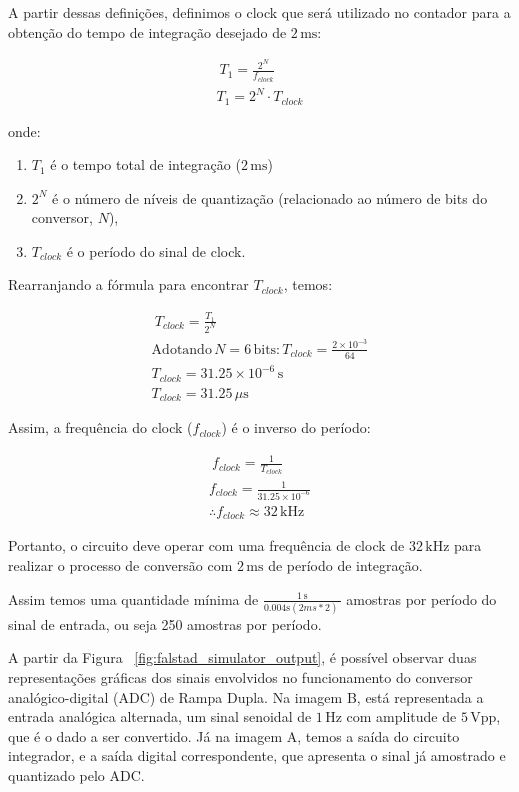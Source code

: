A partir dessas definições, definimos o clock que será utilizado no contador para a obtenção do tempo de integração desejado de $2\, \text{ms}$:

\begin{align} \
    T_{1} = \frac{2^N}{f_{clock}} \\
    T_{1} = 2^N \cdot T_{clock}
\end{align}

onde:
\begin{enumerate}
    \item $T_1$ é o tempo total de integração ($2\, \text{ms}$)
    \item $2^N$ é o número de níveis de quantização (relacionado ao número de bits do conversor, $N$),
    \item $T_{clock}$ é o período do sinal de clock.
\end{enumerate}

Rearranjando a fórmula para encontrar $T_{clock}$, temos:

\begin{align} \
    T_{clock} = \frac{T_{1}}{2^N}               \\
    \text{Adotando} \, N=6 \, \text{bits:} \,
    T_{clock} = \frac{2 \times 10^{-3}}{64}     \\
    T_{clock} = 31.25 \times 10^{-6}\, \text{s} \\
    T_{clock} = 31.25\, \mu\text{s}
\end{align}

Assim, a frequência do clock ($f_{clock}$) é o inverso do período:

\begin{align} \
    f_{clock} = \frac{1}{T_{clock}}            \\
    f_{clock} = \frac{1}{31.25 \times 10^{-6}} \\
    \therefore f_{clock} \approx 32\, \text{kHz}
\end{align}

Portanto, o circuito deve operar com uma frequência de clock de $32\, \text{kHz}$ para realizar o processo de conversão com $2\, \text{ms}$ de período de integração.


Assim temos uma quantidade mínima de $\frac{1\, \text{s}}{0.004\text{s}(2ms*2)\ }$ amostras por período do sinal de entrada, ou seja 250 amostras por período.

A partir da Figura ~\ref{fig:falstad_simulator_output}, é possível observar duas representações gráficas dos sinais envolvidos no funcionamento do conversor analógico-digital (ADC) de Rampa Dupla. Na imagem B, está representada a entrada analógica alternada, um sinal senoidal de $1\, \text{Hz}$ com amplitude de $5\, \text{Vpp}$, que é o dado a ser convertido. Já na imagem A, temos a saída do circuito integrador, e a saída digital correspondente, que apresenta o sinal já amostrado e quantizado pelo ADC.

